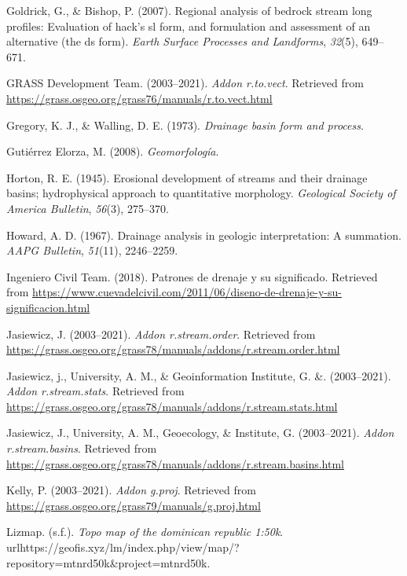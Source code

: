 \documentclass[11pt,]{article}
\begin{document}
\hypertarget{ref-goldrick2007regional}{}
Goldrick, G., \& Bishop, P. (2007). Regional analysis of bedrock stream
long profiles: Evaluation of hack's sl form, and formulation and
assessment of an alternative (the ds form). \emph{Earth Surface
Processes and Landforms}, \emph{32}(5), 649--671.

\hypertarget{ref-tovect}{}
GRASS Development Team. (2003--2021). \emph{Addon r.to.vect}. Retrieved
from \url{https://grass.osgeo.org/grass76/manuals/r.to.vect.html}

\hypertarget{ref-gregory1973drainage}{}
Gregory, K. J., \& Walling, D. E. (1973). \emph{Drainage basin form and
process}.

\hypertarget{ref-gutierrez2008geomorfologia}{}
Gutiérrez Elorza, M. (2008). \emph{Geomorfología}.

\hypertarget{ref-horton1945erosional}{}
Horton, R. E. (1945). Erosional development of streams and their
drainage basins; hydrophysical approach to quantitative morphology.
\emph{Geological Society of America Bulletin}, \emph{56}(3), 275--370.

\hypertarget{ref-howard1967drainage}{}
Howard, A. D. (1967). Drainage analysis in geologic interpretation: A
summation. \emph{AAPG Bulletin}, \emph{51}(11), 2246--2259.

\hypertarget{ref-patron2018}{}
Ingeniero Civil Team. (2018). Patrones de drenaje y su significado.
Retrieved from
\url{https://www.cuevadelcivil.com/2011/06/diseno-de-drenaje-y-su-significacion.html}

\hypertarget{ref-streamorder}{}
Jasiewicz, J. (2003--2021). \emph{Addon r.stream.order}. Retrieved from
\url{https://grass.osgeo.org/grass78/manuals/addons/r.stream.order.html}

\hypertarget{ref-streamstats}{}
Jasiewicz, j., University, A. M., \& Geoinformation Institute, G. \&.
(2003--2021). \emph{Addon r.stream.stats}. Retrieved from
\url{https://grass.osgeo.org/grass78/manuals/addons/r.stream.stats.html}

\hypertarget{ref-streambasinsjareck}{}
Jasiewicz, J., University, A. M., Geoecology, \& Institute, G.
(2003--2021). \emph{Addon r.stream.basins}. Retrieved from
\url{https://grass.osgeo.org/grass78/manuals/addons/r.stream.basins.html}

\hypertarget{ref-gproj}{}
Kelly, P. (2003--2021). \emph{Addon g.proj}. Retrieved from
\url{https://grass.osgeo.org/grass79/manuals/g.proj.html}

\hypertarget{ref-TopoMap}{}
Lizmap. (s.f.). \emph{Topo map of the dominican republic 1:50k}.
urlhttps://geofis.xyz/lm/index.php/view/map/?repository=mtnrd50k\&project=mtnrd50k.
\end{document}
